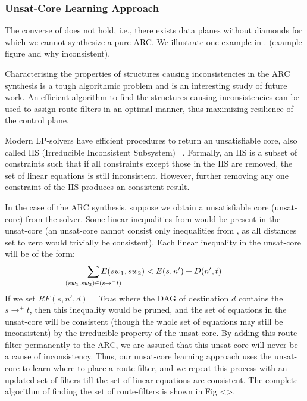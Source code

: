 \subsubsection{Unsat-Core Learning Approach}
The converse of  does not hold, i.e.,
there exists data planes without diamonds for which
we cannot synthesize a pure ARC. We illustrate one example
in \Cref{}. (example figure and why inconsistent). 

Characterising the properties of structures causing
inconsistencies in the ARC synthesis is a tough algorithmic
problem and is an interesting study of future work. An
efficient algorithm to find the structures causing 
inconsistencies can be used to assign route-filters in an
optimal manner, thus maximizing resilience of the control plane.

Modern LP-solvers have efficient procedures to return an
unsatisfiable core, also called IIS (Irreducible Inconsistent Subsystem)
~\cite{iis}. Formally, an IIS is a subset of constraints such that
if all constraints except those in the IIS are removed, the set of
linear equations is still inconsistent. However, further removing 
any one constraint of the IIS produces an consistent result. 

In the case of the ARC synthesis, suppose we obtain
a unsatisfiable core (unsat-core) from the solver. 
Some linear inequalities 
from  would be present in the unsat-core 
(an unsat-core cannot consist only 
inequalities from , as all distances set to zero
would trivially be consistent). Each linear inequality
in the unsat-core will be of the form:
\begin{eqnarray}
	\sum_{\mathclap{\substack{(sw_1, sw_2) \in (s \rightarrow^+ t)}}} 
		E(sw_1, sw_2) < E(s, n') + D(n', t)  \nonumber
\end{eqnarray}
If we set $RF(s,n',d) = True$ where the DAG of destination $d$
contains the $s \rightarrow^+ t$, then this inequality would be pruned,
and the set of equations in the unsat-core will be consistent (though
the whole set of equations may still be inconsistent) by the 
irreducible property of the unsat-core. By adding this route-filter
permanently to the ARC, we are assured that this unsat-core will 
never be a cause of inconsistency. Thus, our unsat-core learning
approach uses the unsat-core to learn where to place a route-filter,
and we repeat this process with an updated set of filters till the
set of linear equations are consistent. The complete 
algorithm of finding the set of route-filters is shown 
in Fig <>.

